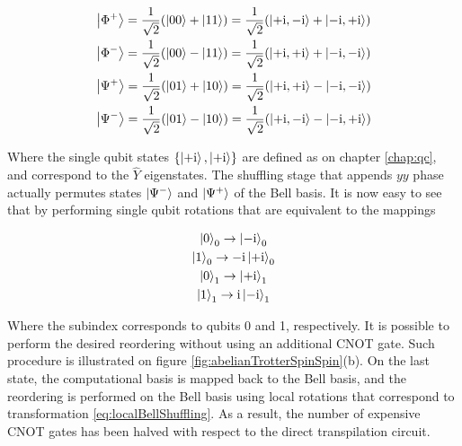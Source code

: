   \begin{gather}
    \ket{\Phi^{+}} = \frac{1}{\sqrt{2}}(\ket{00} + \ket{11}) = \frac{1}{\sqrt{2}}(\ket{+\mathrm{i},-\mathrm{i}} + \ket{-\mathrm{i},+\mathrm{i}}) \\
    \ket{\Phi^{-}} = \frac{1}{\sqrt{2}}(\ket{00} - \ket{11}) = \frac{1}{\sqrt{2}}(\ket{+\mathrm{i},+\mathrm{i}} + \ket{-\mathrm{i},-\mathrm{i}}) \\
    \ket{\Psi^{+}} = \frac{1}{\sqrt{2}}(\ket{01} + \ket{10}) = \frac{1}{\sqrt{2}}(\ket{+\mathrm{i},+\mathrm{i}} - \ket{-\mathrm{i},-\mathrm{i}}) \\
    \ket{\Psi^{-}} = \frac{1}{\sqrt{2}}(\ket{01} - \ket{10}) = \frac{1}{\sqrt{2}}(\ket{+\mathrm{i},-\mathrm{i}} - \ket{-\mathrm{i},+\mathrm{i}}) 
    \label{eq:bellOnYBasis}
  \end{gather}

  Where the single qubit states $\{\ket{+\mathrm{i}}, \ket{+\mathrm{i}}\}$ are defined as on chapter \ref{chap:qc}, and correspond to the $\hat{Y}$ eigenstates. The shuffling stage that appends $yy$ phase actually permutes states $\ket{\Psi^{-}}$ and $\ket{\Psi^{+}}$ of the Bell basis. It is now easy to see that by performing single qubit rotations that are equivalent to the mappings

  \begin{gather}
    \ket{0}_0 \rightarrow \ket{-\mathrm{i}}_0 \\
    \ket{1}_0 \rightarrow -\mathrm{i}\ket{+\mathrm{i}}_0 \\
    \ket{0}_1 \rightarrow \ket{+\mathrm{i}}_1 \\
    \ket{1}_1 \rightarrow \mathrm{i}\ket{-\mathrm{i}}_1 \\
    \label{eq:localBellShuffling}
  \end{gather}

  Where the subindex corresponds to qubits 0 and 1, respectively. It is possible to perform the desired reordering without using an additional CNOT gate. Such procedure is illustrated on figure \ref{fig:abelianTrotterSpinSpin}(b). On the last state, the computational basis is mapped back to the Bell basis, and the reordering is performed on the Bell basis using local rotations that correspond to transformation \ref{eq:localBellShuffling}. As a result, the number of expensive CNOT gates has been halved with respect to the direct transpilation circuit.

  

